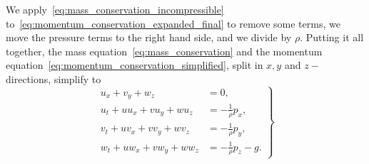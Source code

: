 We apply~\eqref{eq:mass_conservation_incompressible} to~\eqref{eq:momentum_conservation_expanded_final} to remove some terms, we move the pressure terms to the right hand side, and we divide by $\rho$.
Putting it all together, the mass equation~\eqref{eq:mass_conservation} and the momentum equation~\eqref{eq:momentum_conservation_simplified}, split in $x, y$ and $z-$directions, simplify to 
\begin{equation}\label{eq:momentum_conservation_all}
    \left.
    \begin{aligned}
        u_x + v_y + w_z &= 0, \\
        u_t + u u_x + v u_y + w u_z &= - \frac{1}{\rho} p_x, \\
        v_t + u v_x + v v_y + w v_z &= - \frac{1}{\rho} p_y, \\
        w_t + u w_x + v w_y + w w_z &= - \frac{1}{\rho} p_z - g.
    \end{aligned}
    \right\}
\end{equation}


